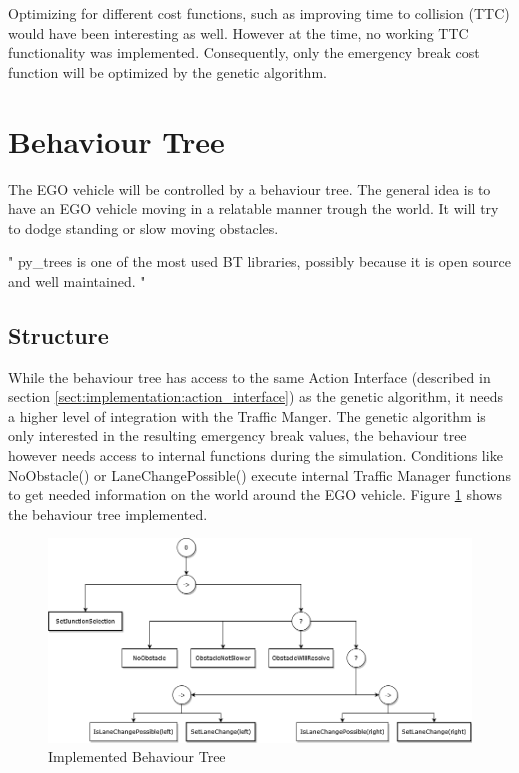 Optimizing for different cost functions, such as improving time to collision (TTC) would have been interesting as well. However at the time, no working TTC functionality was implemented. Consequently, only the emergency break cost function will be optimized by the genetic algorithm.

\section{Behaviour Tree}
The EGO vehicle will be controlled by a behaviour tree. The general idea is to have an EGO vehicle moving in a relatable manner trough the world. It will try to dodge standing or slow moving obstacles.  

"
py\_trees is one of the most used BT libraries, possibly because it is open source and well maintained.
"\cite{iovino_survey_2022}

\subsection{Structure}
While the behaviour tree has access to the same Action Interface (described in section \ref{sect:implementation:action_interface}) as the genetic algorithm, it needs a higher level of integration with the Traffic Manger. The genetic algorithm is only interested in the resulting emergency break values, the behaviour tree however needs access to internal functions during the simulation. Conditions like NoObstacle() or LaneChangePossible() execute internal Traffic Manager functions to get needed information on the world around the EGO vehicle. Figure \ref{fig:implementation:bt} shows the behaviour tree implemented.

\begin{figure}[ht] 
	\includegraphics[width=1\linewidth]{figures/behaviorTree}
	\caption{Implemented Behaviour Tree}
	\label{fig:implementation:bt}
\end{figure}

